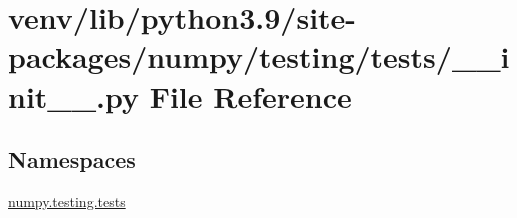 \hypertarget{venv_2lib_2python3_89_2site-packages_2numpy_2testing_2tests_2____init_____8py}{}\section{venv/lib/python3.9/site-\/packages/numpy/testing/tests/\+\_\+\+\_\+init\+\_\+\+\_\+.py File Reference}
\label{venv_2lib_2python3_89_2site-packages_2numpy_2testing_2tests_2____init_____8py}
\subsection*{Namespaces}
\begin{DoxyCompactItemize}
\item 
 \hyperlink{namespacenumpy_1_1testing_1_1tests}{numpy.\+testing.\+tests}
\end{DoxyCompactItemize}
